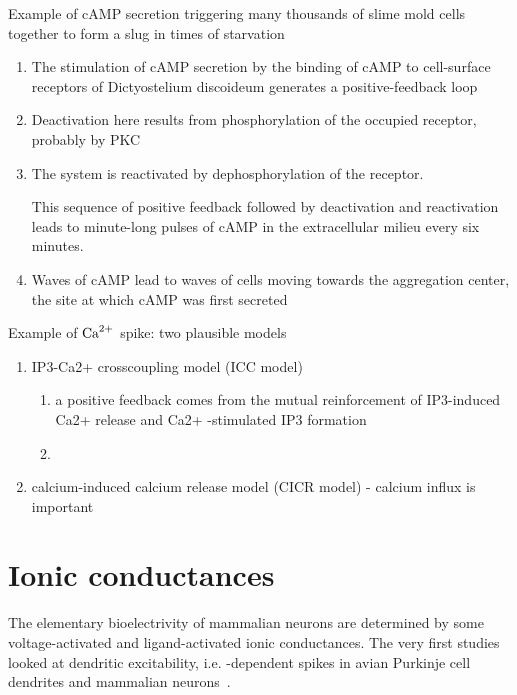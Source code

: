 Example of cAMP secretion triggering many thousands of slime mold cells
together to form a slug in times of starvation
\begin{enumerate}
  \item The stimulation of cAMP secretion by the binding of cAMP to cell-surface
  receptors of Dictyostelium discoideum generates a positive-feedback loop
  
  \item Deactivation here results from phosphorylation of the occupied receptor,
  probably by PKC
  
  
  \item The system is reactivated by dephosphorylation of the receptor.
  
This sequence of positive
feedback followed by deactivation and reactivation leads to minute-long
pulses of cAMP in the extracellular milieu every six minutes.

  \item Waves of cAMP lead to waves of cells moving towards the aggregation
  center, the site at which cAMP was first secreted
\end{enumerate}

Example of ${\text{Ca}^{2+}}$ spike: two plausible models
\begin{enumerate}
  \item  IP3-Ca2+ crosscoupling model (ICC model)

\begin{enumerate}
  \item a positive feedback comes from the mutual reinforcement
of IP3-induced Ca2+ release and Ca2+ -stimulated IP3 formation

  \item 
\end{enumerate}
  
  \item calcium-induced calcium release model (CICR model) - calcium influx is
  important 
  
\end{enumerate}


\section{Ionic conductances}
\label{sec:volt-activ-ionic}

The elementary bioelectrivity of mammalian neurons are determined by
some voltage-activated and ligand-activated ionic conductances.  The
very first studies looked at dendritic excitability,
i.e. -dependent spikes in avian Purkinje cell dendrites and
mammalian neurons~\cite{llinas1988iep}.

